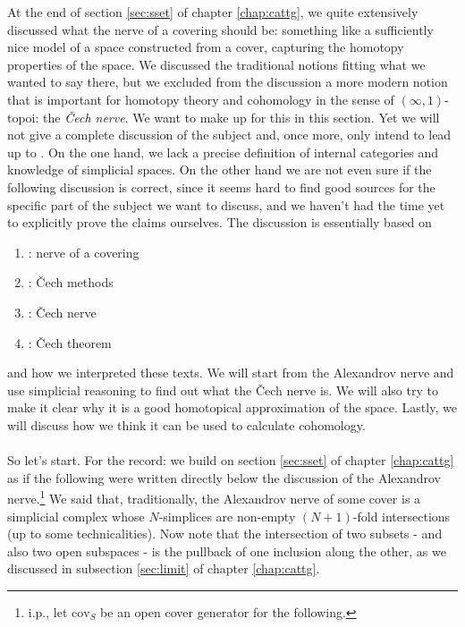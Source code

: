 At the end of section \ref{sec:sset} of chapter \ref{chap:cattg}, we quite extensively discussed what the nerve of a covering should be: something like a sufficiently nice model of a space constructed from a cover, capturing the homotopy properties of the space.
We discussed the traditional notions fitting what we wanted to say there, but we excluded from the discussion a more modern notion that is important for homotopy theory and cohomology in the sense of $(\infty,1)$-topoi: the \textit{\v{C}ech nerve}.
We want to make up for this in this section.
Yet we will not give a complete discussion of the subject and, once more, only intend to lead up to \cite{a565d200}.
On the one hand, we lack a precise definition of internal categories and knowledge of simplicial spaces.
On the other hand we are not even sure if the following discussion is correct, since it seems hard to find good sources for the specific part of the subject we want to discuss, and we haven't had the time yet to explicitly prove the claims ourselves.
The discussion is essentially based on
\begin{enumerate}
\item[$\bullet$]
\cite{wiki-pedia0en}: nerve of a covering
\item[$\bullet$]
\cite{wiki-nlab0000}: \v{C}ech methods
\item[$\bullet$]
\cite{wiki-nlab0000}: \v{C}ech nerve
\item[$\bullet$]
\cite{wiki-nlab0000}: \v{C}ech theorem
\end{enumerate}
and how we interpreted these texts.
We will start from the Alexandrov nerve and use {\glqq}simplicial{\grqq} reasoning to find out what the \v{C}ech nerve is.
We will also try to make it clear why it is a good homotopical approximation of the space.
Lastly, we will discuss how we think it can be used to {\glqq}calculate{\grqq} cohomology.
\\\\
So let's start.
For the record: we build on section \ref{sec:sset} of chapter \ref{chap:cattg} as if the following were written directly below the discussion of the Alexandrov nerve.\footnote{i.p., let $\mathrm{cov}_{S}$ be an open cover generator for the following.}
We said that, traditionally, the Alexandrov nerve of some cover is a simplicial complex whose $N$-simplices are non-empty $(N + 1)$-fold intersections (up to some technicalities).
Now note that the intersection of two subsets - and also two open subspaces - is the pullback of one inclusion along the other, as we discussed in subsection \ref{sec:limit} of chapter \ref{chap:cattg}.
